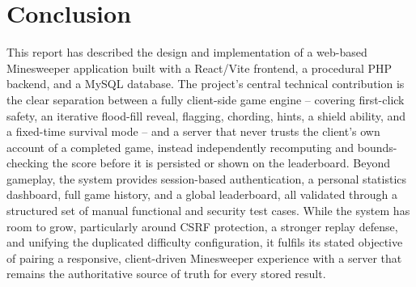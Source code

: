 \chapter{Conclusion}
\label{ch:conclusion}

This report has described the design and implementation of a web-based
Minesweeper application built with a React/Vite frontend, a procedural PHP
backend, and a MySQL database. The project's central technical
contribution is the clear separation between a fully client-side game
engine -- covering first-click safety, an iterative flood-fill reveal,
flagging, chording, hints, a shield ability, and a fixed-time survival
mode -- and a server that never trusts the client's own account of a
completed game, instead independently recomputing and bounds-checking the
score before it is persisted or shown on the leaderboard. Beyond gameplay,
the system provides session-based authentication, a personal statistics
dashboard, full game history, and a global leaderboard, all validated
through a structured set of manual functional and security test cases.
While the system has room to grow, particularly around CSRF protection,
a stronger replay defense, and unifying the duplicated difficulty
configuration, it fulfils its stated objective of pairing a responsive,
client-driven Minesweeper experience with a server that remains the
authoritative source of truth for every stored result.
